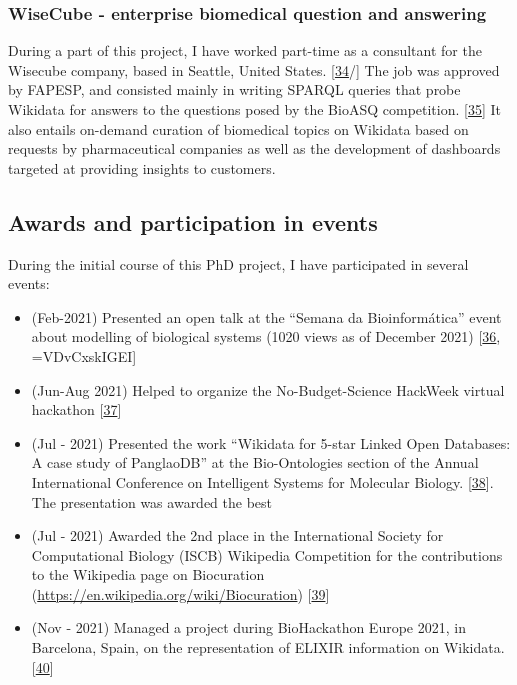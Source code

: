 \hypertarget{wisecube---enterprise-biomedical-question-and-answering}{%
\subsubsection{WiseCube - enterprise biomedical question and answering}\label{wisecube---enterprise-biomedical-question-and-answering}}

During a part of this project, I have worked part-time as a consultant for the Wisecube company, based in Seattle, United States. {[}\protect\hyperlink{ref-gdYsBE7d}{34}/{]}
The job was approved by FAPESP, and consisted mainly in writing SPARQL queries that probe Wikidata for answers to the questions posed by the BioASQ competition. {[}\protect\hyperlink{ref-rkXotO9x}{35}{]}
It also entails on-demand curation of biomedical topics on Wikidata based on requests by pharmaceutical companies as well as the development of dashboards targeted at providing insights to customers.

\hypertarget{awards-and-participation-in-events}{%
\subsection{Awards and participation in events}\label{awards-and-participation-in-events}}

During the initial course of this PhD project, I have participated in several events:

\begin{itemize}
\tightlist
\item
  (Feb-2021) Presented an open talk at the ``Semana da Bioinformática'' event about modelling of biological systems (1020 views as of December 2021) {[}\protect\hyperlink{ref-1C9uHr1Zk}{36}, =VDvCxskIGEI{]}
\item
  (Jun-Aug 2021) Helped to organize the No-Budget-Science HackWeek virtual hackathon {[}\protect\hyperlink{ref-12LOzmXRs}{37}{]}
\item
  (Jul - 2021) Presented the work ``Wikidata for 5-star Linked Open Databases: A case study of PanglaoDB'' at the Bio-Ontologies section of the Annual International Conference on Intelligent Systems for Molecular Biology. {[}\protect\hyperlink{ref-SALI6Ywb}{38}{]}. The presentation was awarded the best
\item
  (Jul - 2021) Awarded the 2nd place in the International Society for Computational Biology (ISCB) Wikipedia Competition for the contributions to the Wikipedia page on Biocuration (\url{https://en.wikipedia.org/wiki/Biocuration}) {[}\protect\hyperlink{ref-IJG65hFm}{39}{]}
\item
  (Nov - 2021) Managed a project during BioHackathon Europe 2021, in Barcelona, Spain, on the representation of ELIXIR information on Wikidata. {[}\protect\hyperlink{ref-14Wi842eZ}{40}{]}
\end{itemize}

